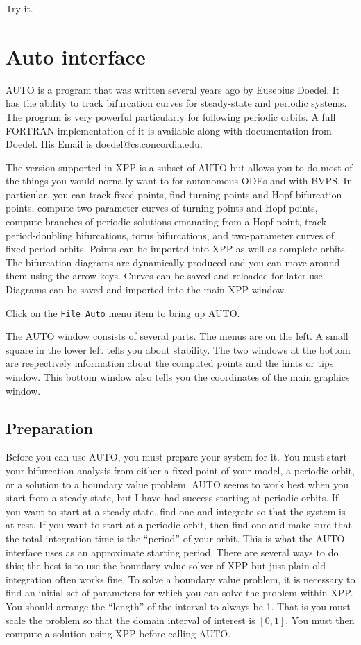 \documentclass{article}
\newcommand{\tc}[1]{\addcontentsline{toc}{subsection}{#1}}
\begin{document}
Try it.

\section{Auto interface}

AUTO is a program that was written several years ago by Eusebius
Doedel.  It has the ability to track bifurcation curves for
steady-state and periodic systems.  The program is very powerful
particularly for following periodic orbits.  A full FORTRAN
implementation of it is available along with documentation from
Doedel.  His Email is doedel@cs.concordia.edu.

The version supported in XPP is a subset of AUTO but allows you to do
most of the things you would nornally want to for autonomous ODEs and with
BVPS.  In
particular, you can track fixed points, find turning points and Hopf
bifurcation points, compute two-parameter curves of turning points and
Hopf points, compute branches of periodic solutions emanating from a
Hopf point, track period-doubling bifurcations, torus bifurcations,
and two-parameter curves of fixed period orbits.  Points can be
imported into XPP as well as complete orbits.  The bifurcation
diagrams are dynamically produced and you can move around them using
the arrow keys.  Curves can be saved and reloaded for later use.
Diagrams can be saved and imported into the main XPP window.

Click on the {\tt File Auto} menu item to bring up AUTO.

\tc{The AUTO Window}  The AUTO window consists of several parts.  The
menus are on the left. A small square in the lower left tells you
about stability.  The two windows at the bottom are respectively
information about the computed points and the hints or tips window.
This bottom window also tells you the coordinates of the main graphics
window.

\subsection{Preparation}

Before you can use AUTO, you must prepare your system for it.  You must
start your bifurcation analysis from either a  fixed point of your
model, a periodic orbit, or a solution to a boundary value problem.
  AUTO seems to work best when you start
from a steady state, but I have had success starting at periodic
orbits.  If you want to start at a steady state, find one and
integrate so that the system is at rest.  If you want to start at a
periodic orbit, then find one and make sure that the total integration
time is the ``period'' of your orbit.  This is what the AUTO interface
uses as an approximate starting period.  There are several ways to do
this; the best is to use the boundary value solver of XPP but just
plain old integration often works fine. To solve a boundary value
problem, it is necessary to find an initial set of parameters for
which you can solve the problem within XPP.  You should arrange the
``length'' of the interval to always be 1.  That is you must scale the
problem so that the domain interval of interest is $[0,1].$ You must
then compute a solution using XPP before calling AUTO.
\end{document}
